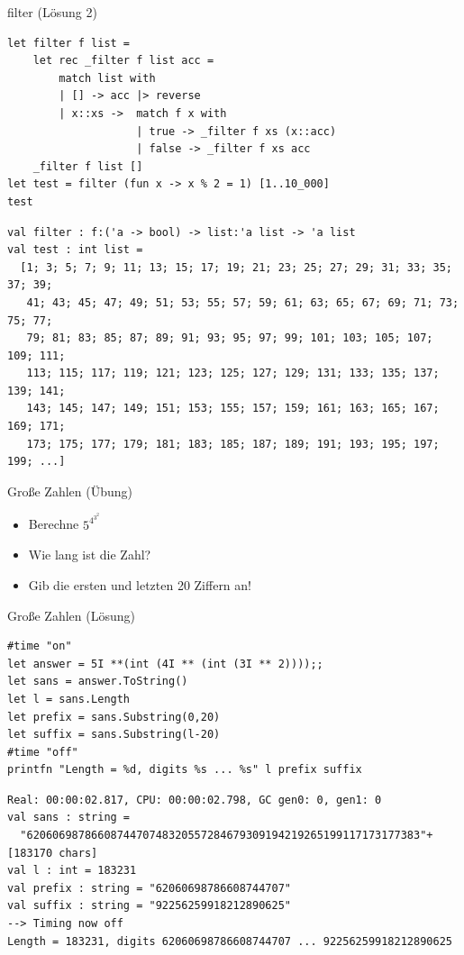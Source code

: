 \documentclass[t]{beamer}
\begin{document}
\begin{frame}[label={sec:orge42a247},fragile]{filter (Lösung 2)}
 \begin{verbatim}
let filter f list = 
    let rec _filter f list acc = 
        match list with
        | [] -> acc |> reverse
        | x::xs ->  match f x with
                    | true -> _filter f xs (x::acc)
                    | false -> _filter f xs acc
    _filter f list []
let test = filter (fun x -> x % 2 = 1) [1..10_000]
test
\end{verbatim}

\begin{verbatim}
val filter : f:('a -> bool) -> list:'a list -> 'a list
val test : int list =
  [1; 3; 5; 7; 9; 11; 13; 15; 17; 19; 21; 23; 25; 27; 29; 31; 33; 35; 37; 39;
   41; 43; 45; 47; 49; 51; 53; 55; 57; 59; 61; 63; 65; 67; 69; 71; 73; 75; 77;
   79; 81; 83; 85; 87; 89; 91; 93; 95; 97; 99; 101; 103; 105; 107; 109; 111;
   113; 115; 117; 119; 121; 123; 125; 127; 129; 131; 133; 135; 137; 139; 141;
   143; 145; 147; 149; 151; 153; 155; 157; 159; 161; 163; 165; 167; 169; 171;
   173; 175; 177; 179; 181; 183; 185; 187; 189; 191; 193; 195; 197; 199; ...]
\end{verbatim}
\end{frame}

\begin{frame}[label={sec:orgd57730c}]{Große Zahlen (Übung)}
\begin{itemize}
\item Berechne \(5^{4^{3^2}}\)
\item Wie lang ist die Zahl?
\item Gib die ersten und letzten 20 Ziffern an!
\end{itemize}
\end{frame}

\begin{frame}[label={sec:org907fe9c},fragile]{Große Zahlen (Lösung)}
 \begin{verbatim}
#time "on"
let answer = 5I **(int (4I ** (int (3I ** 2))));;
let sans = answer.ToString()
let l = sans.Length
let prefix = sans.Substring(0,20)
let suffix = sans.Substring(l-20)
#time "off"
printfn "Length = %d, digits %s ... %s" l prefix suffix
\end{verbatim}

\begin{verbatim}
Real: 00:00:02.817, CPU: 00:00:02.798, GC gen0: 0, gen1: 0
val sans : string =
  "6206069878660874470748320557284679309194219265199117173177383"+[183170 chars]
val l : int = 183231
val prefix : string = "62060698786608744707"
val suffix : string = "92256259918212890625"
--> Timing now off
Length = 183231, digits 62060698786608744707 ... 92256259918212890625
\end{verbatim}
\end{frame}
\end{document}
